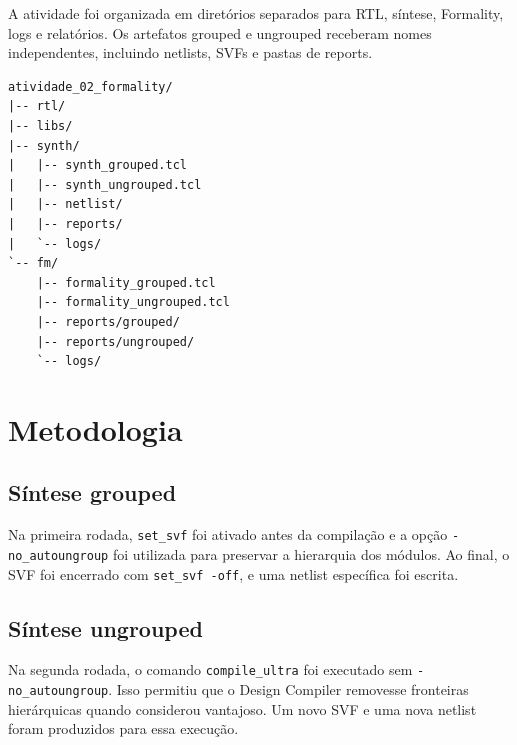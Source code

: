 \documentclass[11pt,a4paper]{article}
\begin{document}
A atividade foi organizada em diretórios separados para RTL, síntese, Formality, logs e relatórios. Os artefatos grouped e ungrouped receberam nomes independentes, incluindo netlists, SVFs e pastas de reports.

\begin{lstlisting}[style=reportstyle,caption={Estrutura principal da Atividade 02.}]
atividade_02_formality/
|-- rtl/
|-- libs/
|-- synth/
|   |-- synth_grouped.tcl
|   |-- synth_ungrouped.tcl
|   |-- netlist/
|   |-- reports/
|   `-- logs/
`-- fm/
    |-- formality_grouped.tcl
    |-- formality_ungrouped.tcl
    |-- reports/grouped/
    |-- reports/ungrouped/
    `-- logs/
\end{lstlisting}

\section{Metodologia}

\subsection{Síntese grouped}

Na primeira rodada, \texttt{set\_svf} foi ativado antes da compilação e a opção \texttt{-no\_autoungroup} foi utilizada para preservar a hierarquia dos módulos. Ao final, o SVF foi encerrado com \texttt{set\_svf -off}, e uma netlist específica foi escrita.



\subsection{Síntese ungrouped}

Na segunda rodada, o comando \texttt{compile\_ultra} foi executado sem \texttt{-no\_autoungroup}. Isso permitiu que o Design Compiler removesse fronteiras hierárquicas quando considerou vantajoso. Um novo SVF e uma nova netlist foram produzidos para essa execução.


\end{document}
